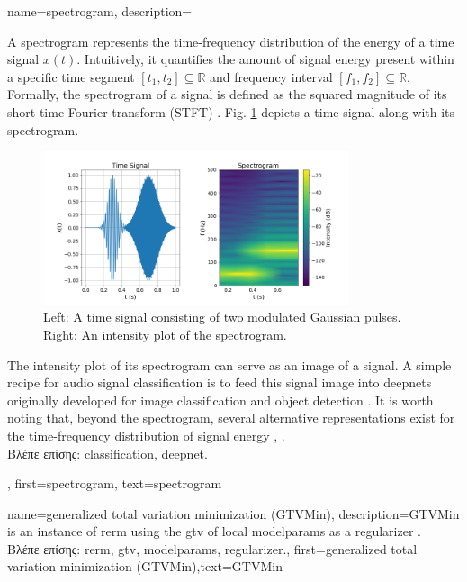 \newcommand{\gaussiancenter}{3}

{name={spectrogram},
	description={
		A spectrogram represents the time-frequency distribution of the energy of a time signal $x(t)$.  
		Intuitively, it quantifies the amount of signal energy present within a specific time segment 
		$[t_{1},t_{2}] \subseteq \mathbb{R}$ and frequency interval $[f_{1},f_{2}]\subseteq \mathbb{R}$. 
		Formally, the spectrogram of a signal is defined as the squared magnitude of its 
		short-time Fourier transform (STFT) \cite{cohen1995time}.
        Fig. \ref{fig:spectrogram_dict} depicts a time signal along with its spectrogram. 
	\begin{figure}[H]
		\centering
		\includegraphics[width=0.8\textwidth]{assets/spectrogram.png}
		\caption{Left: A time signal consisting of two modulated Gaussian pulses. Right: An intensity 
		plot of the spectrogram.
		\label{fig:spectrogram_dict}}
	\end{figure}
        The intensity plot of its spectrogram can serve as an image of a signal. A 
		simple recipe for audio signal \gls{classification} is to feed this signal image 
		into \gls{deepnet}s originally developed for image \gls{classification} and object detection \cite{Li:2022aa}. 
		It is worth noting that, beyond the spectrogram, several alternative representations exist 
		for the time-frequency distribution of signal energy \cite{TimeFrequencyAnalysisBoashash}, \cite{MallatBook}.\\
		\foreignlanguage{greek}{Βλέπε επίσης:} \gls{classification}, \gls{deepnet}.
		}, 
	first={spectrogram},
	text={spectrogram}
}

{name={generalized total variation minimization (GTVMin)},
	description={GTVMin is an instance of \gls{rerm} 
		using the \gls{gtv} of local \gls{modelparams} as a \gls{regularizer} \cite{ClusteredFLTVMinTSP}.\\
		\foreignlanguage{greek}{Βλέπε επίσης:} \gls{rerm}, \gls{gtv}, \gls{modelparams}, \gls{regularizer}.},
	first={generalized total variation minimization (GTVMin)},text={GTVMin} 
}

